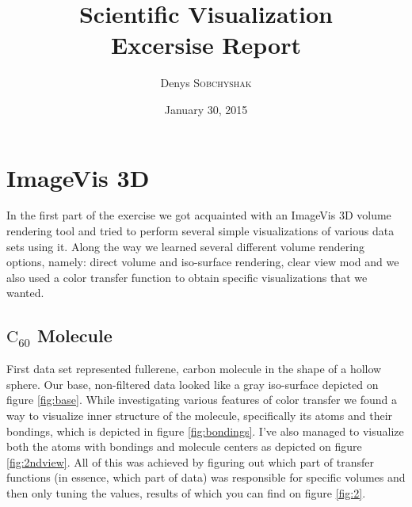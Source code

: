 \documentclass{article}
\title{Scientific Visualization \\ Excersise Report}
\author{Denys \textsc{Sobchyshak}}
\date{January 30, 2015}
\begin{document}
\maketitle

\section{ImageVis 3D}
In the first part of the exercise we got acquainted with an ImageVis 3D volume rendering tool and tried to perform several simple visualizations of various data sets using it. Along the way we learned several different volume rendering options, namely: direct volume and iso-surface rendering, clear view mod and we also used a color transfer function to obtain specific visualizations that we wanted.

\subsection{$\text{C}_{60}$ Molecule}
First data set represented fullerene, carbon molecule in the shape of a hollow sphere. Our base, non-filtered data looked like a gray iso-surface depicted on figure \ref{fig:base}. While investigating various features of color transfer we found a way to visualize inner structure of the molecule, specifically its atoms and their bondings, which is depicted in figure \ref{fig:bondings}. I've also managed to visualize both the atoms with bondings and molecule centers as depicted on figure \ref{fig:2ndview}. All of this was achieved by figuring out which part of transfer functions (in essence, which part of data) was responsible for specific volumes and then only tuning the values, results of which you can find on figure \ref{fig:2}.
\end{document}

